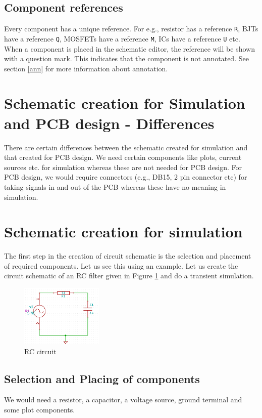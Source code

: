 \subsection{Component references}
Every component has a unique reference. For e.g., resistor has a reference {\tt R}, BJTs have a reference {\tt Q}, MOSFETs have a reference {\tt M}, ICs have a reference {\tt U} etc. When a component is placed in the schematic editor, the reference will be shown with a question mark. This indicates that the component is not annotated. See section \ref{ann} for more information about annotation.
\section{Schematic creation for Simulation and PCB design - Differences}
There are certain differences between the schematic created for simulation and that created for PCB design. We need certain components like plots, current sources etc. for simulation whereas these are not needed for PCB design. For PCB design, we would require connectors (e.g., DB15, 2 pin connector etc) for taking signals in and out of the PCB whereas these have no meaning in simulation. 
\section{Schematic creation for simulation}
The first step in the creation of circuit schematic is the selection and placement of required components. Let us see this using an example. Let us create the circuit schematic of an RC filter given in Figure \ref{schemRC} and do a transient simulation.
\begin{figure}
\centering
\includegraphics[width=0.35\textwidth]{figures/schemRC}
\caption{RC circuit}
\label{schemRC}
\end{figure}
\subsection{Selection and Placing of components}
We would need a resistor, a capacitor, a voltage source, ground terminal and some plot components. 


